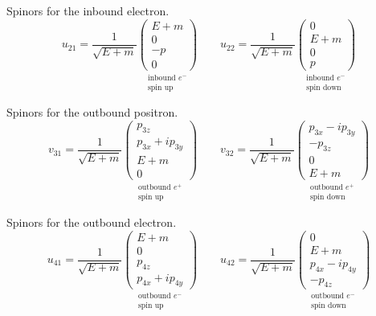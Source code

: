 Spinors for the inbound electron.
\begin{equation*}
u_{21}=\frac{1}{\sqrt{E+m}}
\underset{\substack{\text{inbound $e^-$}\\ \text{spin up}}}
{\begin{pmatrix}E+m\\0\\-p\\0\end{pmatrix}}
\qquad
u_{22}=\frac{1}{\sqrt{E+m}}
\underset{\substack{\text{inbound $e^-$}\\ \text{spin down}}}
{\begin{pmatrix}0\\E+m\\0\\p\end{pmatrix}}
\end{equation*}

Spinors for the outbound positron.
\begin{equation*}
v_{31}=\frac{1}{\sqrt{E+m}}
\underset{\substack{\text{outbound $e^+$}\\ \text{spin up}}}
{\begin{pmatrix}p_{3z}\\p_{3x}+ip_{3y}\\E+m\\0\end{pmatrix}}
\qquad
v_{32}=\frac{1}{\sqrt{E+m}}
\underset{\substack{\text{outbound $e^+$}\\ \text{spin down}}}
{\begin{pmatrix}p_{3x}-ip_{3y}\\-p_{3z}\\0\\E+m\end{pmatrix}}
\end{equation*}

Spinors for the outbound electron.
\begin{equation*}
u_{41}=\frac{1}{\sqrt{E+m}}
\underset{\substack{\text{outbound $e^-$}\\ \text{spin up}}}
{\begin{pmatrix}E+m\\0\\p_{4z}\\p_{4x}+ip_{4y}\end{pmatrix}}
\qquad
u_{42}=\frac{1}{\sqrt{E+m}}
\underset{\substack{\text{outbound $e^-$}\\ \text{spin down}}}
{\begin{pmatrix}0\\E+m\\p_{4x}-ip_{4y}\\-p_{4z}\end{pmatrix}}
\end{equation*}

